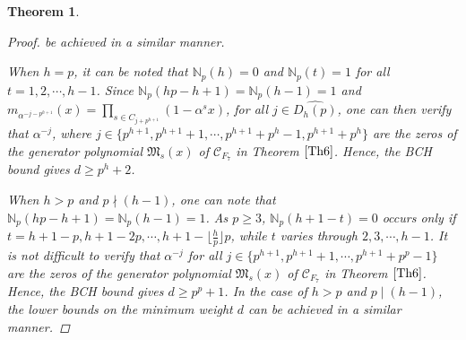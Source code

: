 \documentclass[pdflatex,sn-mathphys-num]{sn-jnl}%
\theoremstyle{thmstyleone}%
\newtheorem{theorem}{Theorem}%
\theoremstyle{thmstyletwo}%
\theoremstyle{thmstylethree}%
\begin{document}
\begin{theorem}
\begin{proof}
        be achieved in a similar manner.
        \par When $h=p$, it can be noted that $\mathbb{N}_{p}(h)=0$ and $\mathbb{N}_{p}(t)=1$ for all $t=1,2,\cdots,h-1$. Since $\mathbb{N}_{p}(hp-h+1)=\mathbb{N}_{p}(h-1)=1$ and $m_{\alpha^{-j-p^{h+1}}}(x)=\prod_{s\in C_{j+p^{h+1}}}(1-\alpha^{s}x)$, for all $j\in\widehat{D_{h}(p)}$, one can then verify that $\alpha^{-j}$, where $j\in\{p^{h+1},p^{h+1}+1,\cdots,p^{h+1}+p^{h}-1,p^{h+1}+p^{h}\}$ are the zeros of the generator polynomial $\mathfrak{M}_{s}(x)$ of $\mathcal{C}_{F_{7}}$ in Theorem $\ref{Th6}$. Hence, the BCH bound gives $d\geq p^{h}+2$.
        
        \par When $h>p$ and $p\nmid(h-1)$, one can note that $\mathbb{N}_{p}(hp-h+1)=\mathbb{N}_{p}(h-1)=1$. As $p\geq 3$, $\mathbb{N}_{p}(h+1-t)=0$ occurs only if $t=h+1-p,h+1-2p,\cdots,h+1-\lfloor\frac{h}{p}\rfloor p$, while $t$ varies through $2,3,\cdots,h-1$. It is not difficult to verify that $\alpha^{-j}$ for all $j\in\{p^{h+1},p^{h+1}+1,\cdots,p^{h+1}+p^{p}-1\}$ are the zeros of the generator polynomial $\mathfrak{M}_{s}(x)$ of $\mathcal{C}_{F_{7}}$ in Theorem $\ref{Th6}$. Hence, the BCH bound gives $d\geq p^{p}+1$. In the case of $h>p$ and $p\mid (h-1)$, the lower bounds on the minimum weight $d$ can be achieved in a similar manner.
    \end{proof}
\end{theorem}
\end{document}

